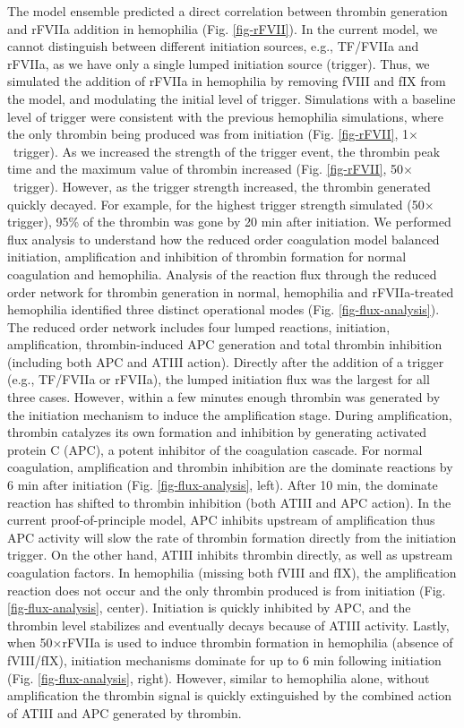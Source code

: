 \documentclass[12pt]{article}
\begin{document}
The model ensemble predicted a direct correlation between thrombin generation and rFVIIa addition in hemophilia (Fig. \ref{fig-rFVII}).
In the current model, we cannot distinguish between different initiation sources, e.g., TF/FVIIa and rFVIIa, as we have only a single lumped initiation source (trigger).
Thus, we simulated the addition of rFVIIa in hemophilia by removing fVIII and fIX from the model, and modulating the initial level of trigger.
Simulations with a baseline level of trigger were consistent with the previous hemophilia simulations, where the only thrombin being produced was from initiation (Fig. \ref{fig-rFVII}, 1$\times$~trigger).
As we increased the strength of the trigger event, the thrombin peak time and the maximum value of thrombin increased (Fig. \ref{fig-rFVII}, 50$\times$~trigger). 
However, as the trigger strength increased, the thrombin generated quickly decayed.
For example, for the highest trigger strength simulated (50$\times$trigger), 95\% of the thrombin was gone by 20 min after initiation. 
We performed flux analysis to understand how the reduced order coagulation model balanced initiation, amplification and inhibition of thrombin formation for normal coagulation and hemophilia.
Analysis of the reaction flux through the reduced order network for thrombin generation in normal, hemophilia and rFVIIa-treated hemophilia identified three distinct operational modes (Fig. \ref{fig-flux-analysis}).
The reduced order network includes four lumped reactions, initiation, amplification, thrombin-induced APC generation and total thrombin inhibition (including both APC and ATIII action).
Directly after the addition of a trigger (e.g., TF/FVIIa or rFVIIa), the lumped initiation flux was the largest for all three cases.
However, within a few minutes enough thrombin was generated by the initiation mechanism to induce the amplification stage. 
During amplification, thrombin catalyzes its own formation and inhibition by generating activated protein C (APC), a potent inhibitor of the coagulation cascade.
For normal coagulation, amplification and thrombin inhibition are the dominate reactions by 6 min after initiation (Fig. \ref{fig-flux-analysis}, left). 
After 10 min, the dominate reaction has shifted to thrombin inhibition (both ATIII and APC action). In the current proof-of-principle model, 
APC inhibits upstream of amplification thus APC activity will slow the rate of thrombin formation directly from the initiation trigger. 
On the other hand, ATIII inhibits thrombin directly, as well as upstream coagulation factors.
In hemophilia (missing both fVIII and fIX), the amplification reaction does not occur and the only thrombin produced is from initiation (Fig. \ref{fig-flux-analysis}, center).
Initiation is quickly inhibited by APC, and the thrombin level stabilizes and eventually decays because of ATIII activity. 
Lastly, when 50$\times$rFVIIa is used to induce thrombin formation in hemophilia (absence of fVIII/fIX), 
initiation mechanisms dominate for up to 6 min following initiation (Fig. \ref{fig-flux-analysis}, right). 
However, similar to hemophilia alone, without amplification the thrombin signal is quickly extinguished by the combined action of ATIII and APC generated by thrombin.   
\end{document}
